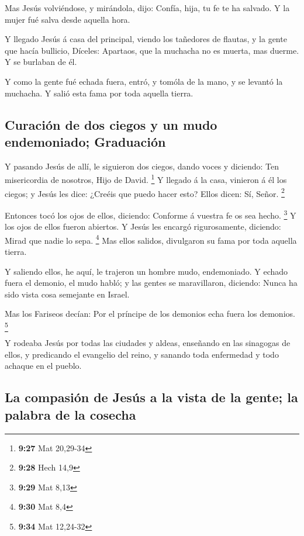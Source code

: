  Mas Jesús volviéndose, y mirándola, dijo: Confía, hija,
tu fe te ha salvado. Y la mujer fué salva desde aquella hora.

 Y llegado Jesús á casa del principal, viendo los
tañedores de flautas, y la gente que hacía bullicio, 
Díceles: Apartaos, que la muchacha no es muerta, mas duerme. Y se
burlaban de él.

 Y como la gente fué echada fuera, entró, y tomóla de la
mano, y se levantó la muchacha.  Y salió esta fama por
toda aquella tierra.

\hypertarget{curaciuxf3n-de-dos-ciegos-y-un-mudo-endemoniado-graduaciuxf3n}{%
\subsection{Curación de dos ciegos y un mudo endemoniado;
Graduación}\label{curaciuxf3n-de-dos-ciegos-y-un-mudo-endemoniado-graduaciuxf3n}}

 Y pasando Jesús de allí, le siguieron dos ciegos, dando
voces y diciendo: Ten misericordia de nosotros, Hijo de David.
\footnote{\textbf{9:27} Mat 20,29-34}  Y llegado á la
casa, vinieron á él los ciegos; y Jesús les dice: ¿Creéis que puedo
hacer esto? Ellos dicen: Sí, Señor. \footnote{\textbf{9:28} Hech 14,9}

 Entonces tocó los ojos de ellos, diciendo: Conforme á
vuestra fe os sea hecho. \footnote{\textbf{9:29} Mat 8,13}
 Y los ojos de ellos fueron abiertos. Y Jesús les encargó
rigurosamente, diciendo: Mirad que nadie lo sepa. \footnote{\textbf{9:30}
  Mat 8,4}  Mas ellos salidos, divulgaron su fama por
toda aquella tierra.

 Y saliendo ellos, he aquí, le trajeron un hombre mudo,
endemoniado.  Y echado fuera el demonio, el mudo habló; y
las gentes se maravillaron, diciendo: Nunca ha sido vista cosa semejante
en Israel.

 Mas los Fariseos decían: Por el príncipe de los demonios
echa fuera los demonios. \footnote{\textbf{9:34} Mat 12,24-32}

 Y rodeaba Jesús por todas las ciudades y aldeas,
enseñando en las sinagogas de ellos, y predicando el evangelio del
reino, y sanando toda enfermedad y todo achaque en el pueblo.

\hypertarget{la-compasiuxf3n-de-jesuxfas-a-la-vista-de-la-gente-la-palabra-de-la-cosecha}{%
\subsection{La compasión de Jesús a la vista de la gente; la palabra de
la
cosecha}\label{la-compasiuxf3n-de-jesuxfas-a-la-vista-de-la-gente-la-palabra-de-la-cosecha}}

